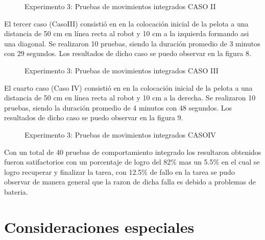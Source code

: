 \documentclass[tikz,conference, letterpaper]{IEEEtranMC1}
\begin{document}
\begin{figure}
\caption{Experimento 3: Pruebas de movimientos integrados CASO II}
\end{figure}

El tercer caso  (CasoIII) consistió en en la colocación inicial de la pelota a una distancia de 50 cm en línea recta al robot y 10 cm a la izquierda formando asi una diagonal. Se realizaron 10 pruebas, siendo la duración promedio de 3 minutos con 29 segundos. Los resultados de dicho caso se puedo observar en la figura 8. 

\begin{figure}
\caption{Experimento 3: Pruebas de movimientos integrados CASO III}
\end{figure}

El cuarto caso  (Caso IV) consistió en en la colocación inicial de la pelota a una distancia de 50 cm en línea recta al robot y 10 cm a la derecha. Se realizaron 10 pruebas, siendo la duración promedio de 4 minutos con 48 segundos.  Los resultados de dicho caso se puedo observar en la figura 9. 

\begin{figure}
\caption{Experimento 3: Pruebas de movimientos integrados CASOIV}
\end{figure} 

Con un total de 40 pruebas de comportamiento integrado los resultaron obtenidos fueron satifactorios con un porcentaje de logro del 82\% mas un 5.5\% en el cual se logro recuperar y finalizar la tarea, con 12.5\% de fallo en la tarea se pudo observar de manera general que la razon de dicha falla es debido a problemas de bateria. 



\section{Consideraciones especiales}
\label{sec:consideraciones}
\end{document}
